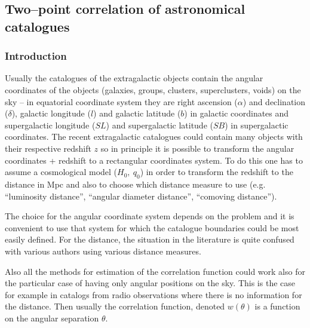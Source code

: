  
\subsection{Two--point correlation of astronomical catalogues}

\subsubsection{Introduction}
Usually the catalogues of the extragalactic objects contain the
angular coordinates of the objects (galaxies, groups, clusters,
superclusters, voids) on the sky -- in equatorial coordinate system
they are right ascension ($\alpha$) and declination ($\delta$),
galactic longitude ($l$) and galactic latitude ($b$) in galactic
coordinates and supergalactic longitude ($SL$) and supergalactic
latitude ($SB$) in supergalactic coordinates. The recent
extragalactic catalogues could contain many objects with their
respective redshift $z$ so in principle it is possible to transform
the angular coordinates + redshift to a rectangular coordinates
system. To do this one has to assume a cosmological model ($H_0,\ 
q_0$) in order to transform the redshift to the distance in Mpc and
also to choose which distance measure to use (e.g. ``luminosity
distance'', ``angular diameter distance'', ``comoving distance'').

The choice for the angular coordinate system depends on the problem
and it is convenient to use that system for which the catalogue
boundaries could be most easily defined. For the distance, the
situation in the literature is quite confused with various authors
using various distance measures. 

Also all the methods for estimation of the correlation function could
work also for the particular case of having only angular positions on
the sky. This is the case for example in catalogs from radio
observations where there is no information for the distance. Then
usually the correlation function, denoted $w(\theta)$ is a function on 
the angular separation $\theta$.


